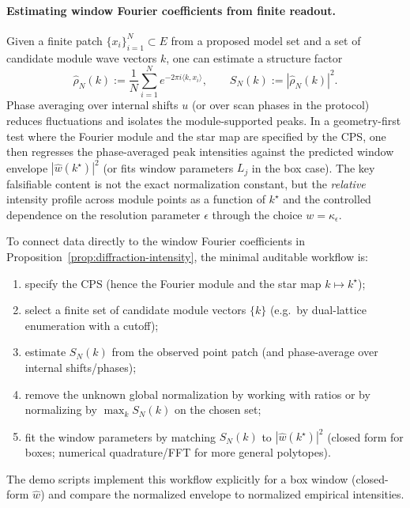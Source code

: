 \paragraph{Estimating window Fourier coefficients from finite readout.}
Given a finite patch $\{x_i\}_{i=1}^N\subset E$ from a proposed model set and a set of candidate module wave vectors $k$, one can estimate a structure factor
\[
\widehat\rho_N(k):=\frac{1}{N}\sum_{i=1}^N e^{-2\pi i\langle k,x_i\rangle},
\qquad
S_N(k):=|\widehat\rho_N(k)|^2.
\]
Phase averaging over internal shifts $u$ (or over scan phases in the protocol) reduces fluctuations and isolates the module-supported peaks. In a geometry-first test where the Fourier module and the star map are specified by the CPS, one then regresses the phase-averaged peak intensities against the predicted window envelope $|\widehat w(k^\star)|^2$ (or fits window parameters $L_j$ in the box case). The key falsifiable content is not the exact normalization constant, but the \emph{relative} intensity profile across module points as a function of $k^\star$ and the controlled dependence on the resolution parameter $\epsilon$ through the choice $w=\kappa_\epsilon$.

\begin{remark}\label{rem:estimate-window-fourier}
To connect data directly to the window Fourier coefficients in Proposition~\ref{prop:diffraction-intensity}, the minimal auditable workflow is:
\begin{enumerate}[label=(\roman*),leftmargin=*,itemsep=2pt]
  \item specify the CPS (hence the Fourier module and the star map $k\mapsto k^\star$);
  \item select a finite set of candidate module vectors $\{k\}$ (e.g.\ by dual-lattice enumeration with a cutoff);
  \item estimate $S_N(k)$ from the observed point patch (and phase-average over internal shifts/phases);
  \item remove the unknown global normalization by working with ratios or by normalizing by $\max_k S_N(k)$ on the chosen set;
  \item fit the window parameters by matching $S_N(k)$ to $|\widehat w(k^\star)|^2$ (closed form for boxes; numerical quadrature/FFT for more general polytopes).
\end{enumerate}
The demo scripts implement this workflow explicitly for a box window (closed-form $\widehat w$) and compare the normalized envelope to normalized empirical intensities.\cite{RichardStrungaru2017}
\end{remark}

